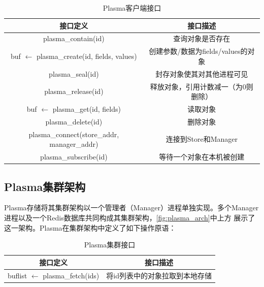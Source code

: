 \begin{table}[h]
    \centering
    \caption{Plasma客户端接口}
    \begin{tabular}{*{2}{c}}
        \toprule
        接口定义 & 接口描述      \\
        \midrule
        plasma\_contain(id)                                    & 查询对象是否存在   \\
        buf $\leftarrow$ plasma\_create(id, fields, values)    & 创建参数/数据为fields/values的对象   \\
        plasma\_seal(id)                                       & 封存对象使其对其他进程可见   \\
        plasma\_release(id)                                    & 释放对象，引用计数减一（为0则删除）   \\
        buf $\leftarrow$ plasma\_get(id, fields)               & 读取对象   \\
        plasma\_delete(id)                                     & 删除对象   \\
        \midrule
        plasma\_connect(store\_addr, manager\_addr)            & 连接到Store和Manager \\
        plasma\_subscribe(id)                                  & 等待一个对象在本机被创建 \\ 
        \bottomrule
    \end{tabular}
    \label{tab:store_api}
\end{table}

\subsection{Plasma集群架构}
\label{sec:plasma_cluster}

Plasma存储将其集群架构以一个管理者（Manager）进程单独实现。多个Manager进程以及一个Redis数据库共同构成其集群架构，\autoref{fig:plasma_arch}中上方
展示了这一架构。Plasma在集群架构中定义了如下操作原语：

\begin{table}[h]
    \centering
    \caption{Plasma集群接口}
    \begin{tabular}{*{2}{c}}
        \toprule
        接口定义 & 接口描述      \\
        \midrule
        buflist $\leftarrow$ plasma\_fetch(ids)               & 将id列表中的对象拉取到本地存储   \\
        \bottomrule
    \end{tabular}
    \label{tab:manager_api}
\end{table}

